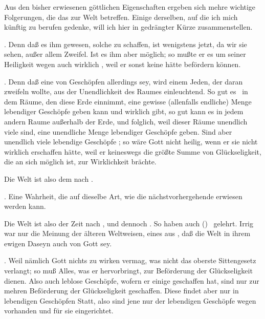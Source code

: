 Aus den bisher erwiesenen göttlichen Eigenschaften ergeben sich mehre wichtige Folgerungen, die das  zur Welt betreffen. Einige derselben, auf die ich mich künftig zu berufen gedenke, will ich hier in gedrängter Kürze zusammenstellen.
\begin{aufza}
\item {}. Denn daß es ihm  gewesen, solche zu schaffen, ist wenigstens jetzt, da wir sie  sehen, außer allem Zweifel. Ist es ihm aber möglich; so mußte er es um seiner Heiligkeit wegen auch wirklich , weil er sonst keine  hätte befördern können.
\item {}. Denn daß eine  von Geschöpfen allerdings  sey, wird einem Jeden, der daran zweifeln wollte, aus der Unendlichkeit des Raumes einleuchtend. So gut es \zB\ in dem Räume, den diese Erde einnimmt, eine gewisse (allenfalls endliche) Menge lebendiger Geschöpfe geben kann und wirklich gibt, so gut kann es in jedem andern Raume außerhalb der Erde, und folglich, weil dieser Räume unendlich viele sind, eine unendliche Menge lebendiger Geschöpfe geben. Sind aber unendlich viele lebendige Geschöpfe ; so wäre Gott nicht heilig, wenn er sie nicht wirklich erschaffen hätte, weil er keineswegs die größte Summe von Glückseligkeit, die an sich möglich ist, zur Wirklichkeit brächte.
\begin{RWanm}
Die Welt ist also dem  nach .
\end{RWanm}
\item {}. Eine Wahrheit, die auf dieselbe Art, wie die nächstvorhergehende erwiesen werden kann.~
\begin{RWanm} 
Die Welt ist also der Zeit nach , und dennoch . So haben auch  () \uA\ gelehrt. Irrig war nur die Meinung der älteren Weltweisen, eines  aus , daß die Welt in ihrem ewigen Daseyn auch von Gott  sey.
\end{RWanm}
\item {}. Weil nämlich Gott nichts zu wirken vermag, was nicht das oberste Sittengesetz verlangt; so muß Alles, was er hervorbringt, zur Beförderung der Glückseligkeit dienen. Also auch leblose Geschöpfe, wofern er einige geschaffen hat, sind nur zur mehren Beförderung der Glückseligkeit geschaffen. Diese findet aber nur in lebendigen Geschöpfen Statt, also sind jene nur der lebendigen Geschöpfe wegen vorhanden und für sie eingerichtet.

\end{aufza}

